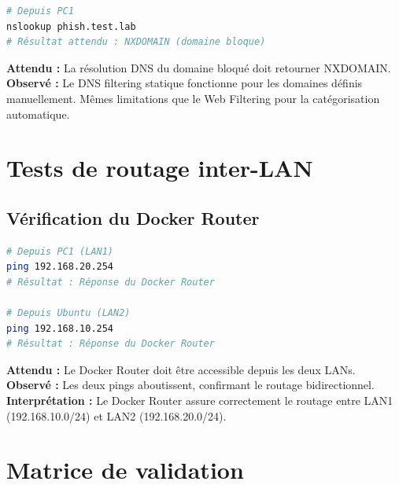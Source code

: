 \begin{lstlisting}[language=bash, caption={Test DNS Filter}]
# Depuis PC1
nslookup phish.test.lab
# Résultat attendu : NXDOMAIN (domaine bloque)
\end{lstlisting}

\noindent\textbf{Attendu :} La résolution DNS du domaine bloqué doit retourner NXDOMAIN. \textbf{Observé :} Le DNS filtering statique fonctionne pour les domaines définis manuellement. Mêmes limitations que le Web Filtering pour la catégorisation automatique.

\section{Tests de routage inter-LAN}

\subsection{Vérification du Docker Router}

\begin{lstlisting}[language=bash, caption={Verification du routage cross-LAN}]
# Depuis PC1 (LAN1)
ping 192.168.20.254
# Résultat : Réponse du Docker Router

# Depuis Ubuntu (LAN2)
ping 192.168.10.254
# Résultat : Réponse du Docker Router
\end{lstlisting}

\noindent\textbf{Attendu :} Le Docker Router doit être accessible depuis les deux LANs. \textbf{Observé :} Les deux pings aboutissent, confirmant le routage bidirectionnel. \textbf{Interprétation :} Le Docker Router assure correctement le routage entre LAN1 (192.168.10.0/24) et LAN2 (192.168.20.0/24).

\section{Matrice de validation}


